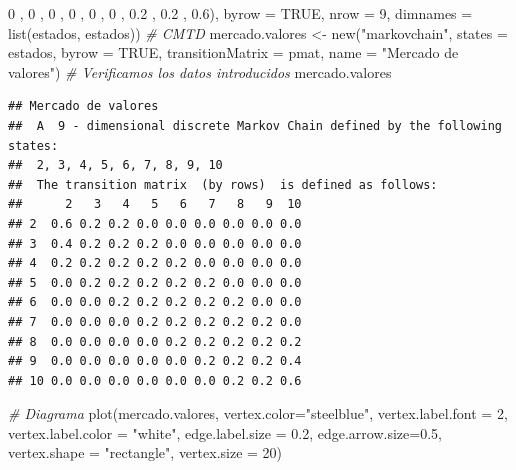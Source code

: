 \documentclass[
]{book}
\newenvironment{Shaded}{\begin{snugshade}}{\end{snugshade}}
\newcommand{\AttributeTok}[1]{\textcolor[rgb]{0.77,0.63,0.00}{#1}}
\newcommand{\CommentTok}[1]{\textcolor[rgb]{0.56,0.35,0.01}{\textit{#1}}}
\newcommand{\ConstantTok}[1]{\textcolor[rgb]{0.00,0.00,0.00}{#1}}
\newcommand{\DecValTok}[1]{\textcolor[rgb]{0.00,0.00,0.81}{#1}}
\newcommand{\FloatTok}[1]{\textcolor[rgb]{0.00,0.00,0.81}{#1}}
\newcommand{\FunctionTok}[1]{\textcolor[rgb]{0.00,0.00,0.00}{#1}}
\newcommand{\NormalTok}[1]{#1}
\newcommand{\OtherTok}[1]{\textcolor[rgb]{0.56,0.35,0.01}{#1}}
\newcommand{\StringTok}[1]{\textcolor[rgb]{0.31,0.60,0.02}{#1}}
\theoremstyle{definition}
\theoremstyle{definition}
\theoremstyle{definition}
\theoremstyle{definition}
\theoremstyle{remark}
\begin{document}
\begin{Shaded}
\begin{Highlighting}[]
                        \DecValTok{0}\NormalTok{ , }\DecValTok{0}\NormalTok{ , }\DecValTok{0}\NormalTok{ , }\DecValTok{0}\NormalTok{ , }\DecValTok{0}\NormalTok{ , }\DecValTok{0}\NormalTok{ , }\FloatTok{0.2}\NormalTok{ , }\FloatTok{0.2}\NormalTok{ , }\FloatTok{0.6}\NormalTok{), }
               \AttributeTok{byrow =} \ConstantTok{TRUE}\NormalTok{, }\AttributeTok{nrow =} \DecValTok{9}\NormalTok{, }
               \AttributeTok{dimnames =} \FunctionTok{list}\NormalTok{(estados, estados))}
\CommentTok{\# CMTD}
\NormalTok{mercado.valores }\OtherTok{\textless{}{-}} \FunctionTok{new}\NormalTok{(}\StringTok{"markovchain"}\NormalTok{, }\AttributeTok{states =}\NormalTok{ estados, }
                 \AttributeTok{byrow =} \ConstantTok{TRUE}\NormalTok{, }\AttributeTok{transitionMatrix =}\NormalTok{ pmat, }
                 \AttributeTok{name =} \StringTok{"Mercado de valores"}\NormalTok{)}
\CommentTok{\# Verificamos los datos introducidos}
\NormalTok{mercado.valores}
\end{Highlighting}
\end{Shaded}

\begin{verbatim}
## Mercado de valores 
##  A  9 - dimensional discrete Markov Chain defined by the following states: 
##  2, 3, 4, 5, 6, 7, 8, 9, 10 
##  The transition matrix  (by rows)  is defined as follows: 
##      2   3   4   5   6   7   8   9  10
## 2  0.6 0.2 0.2 0.0 0.0 0.0 0.0 0.0 0.0
## 3  0.4 0.2 0.2 0.2 0.0 0.0 0.0 0.0 0.0
## 4  0.2 0.2 0.2 0.2 0.2 0.0 0.0 0.0 0.0
## 5  0.0 0.2 0.2 0.2 0.2 0.2 0.0 0.0 0.0
## 6  0.0 0.0 0.2 0.2 0.2 0.2 0.2 0.0 0.0
## 7  0.0 0.0 0.0 0.2 0.2 0.2 0.2 0.2 0.0
## 8  0.0 0.0 0.0 0.0 0.2 0.2 0.2 0.2 0.2
## 9  0.0 0.0 0.0 0.0 0.0 0.2 0.2 0.2 0.4
## 10 0.0 0.0 0.0 0.0 0.0 0.0 0.2 0.2 0.6
\end{verbatim}

\begin{Shaded}
\begin{Highlighting}[]
\CommentTok{\# Diagrama}
\FunctionTok{plot}\NormalTok{(mercado.valores, }\AttributeTok{vertex.color=}\StringTok{"steelblue"}\NormalTok{, }
     \AttributeTok{vertex.label.font =} \DecValTok{2}\NormalTok{, }
     \AttributeTok{vertex.label.color =} \StringTok{"white"}\NormalTok{,}
     \AttributeTok{edge.label.size =} \FloatTok{0.2}\NormalTok{,}
     \AttributeTok{edge.arrow.size=}\FloatTok{0.5}\NormalTok{, }
     \AttributeTok{vertex.shape =} \StringTok{"rectangle"}\NormalTok{,}
     \AttributeTok{vertex.size =} \DecValTok{20}\NormalTok{)}
\end{Highlighting}
\end{Shaded}
\end{document}
